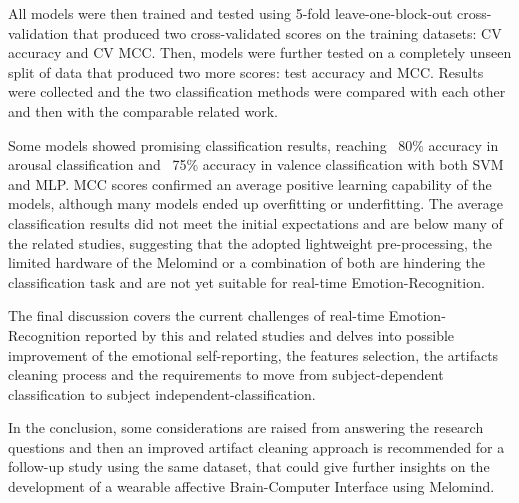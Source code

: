 All models were then trained and tested using 5-fold leave-one-block-out cross-validation that produced two cross-validated scores on the training datasets: CV accuracy and CV MCC. Then, models were further tested on a completely unseen split of data that produced two more scores: test accuracy and MCC. Results were collected and the two classification methods were compared with each other and then with the comparable related work. 

Some models showed promising classification results, reaching ~80\% accuracy in arousal classification and ~75\% accuracy in valence classification with both SVM and MLP. MCC scores confirmed an average positive learning capability of the models, although many models ended up overfitting or underfitting. The average classification results did not meet the initial expectations and are below many of the related studies, suggesting that the adopted lightweight pre-processing, the limited hardware of the Melomind or a combination of both are hindering the classification task and are not yet suitable for real-time Emotion-Recognition.

The final discussion covers the current challenges of real-time Emotion-Recognition reported by this and related studies and delves into possible improvement of the emotional self-reporting, the features selection, the artifacts cleaning process and the requirements to move from subject-dependent classification to subject independent-classification.

In the conclusion, some considerations are raised from answering the research questions and then an improved artifact cleaning approach is recommended for a follow-up study using the same dataset, that could give further insights on the development of a wearable affective Brain-Computer Interface using Melomind.
